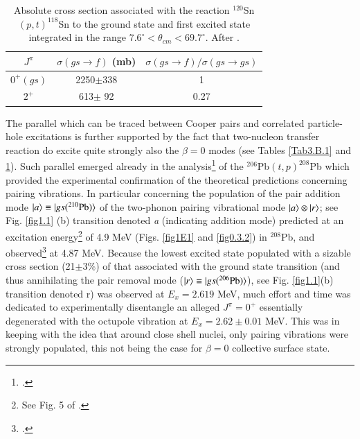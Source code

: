     \begin{table}
    	\begin{tabular}{|c|c|c|}
    		\hline
    		$J^{\pi}$& $\sigma(gs\rightarrow f)$ (mb) & $\sigma(gs\rightarrow f)/\sigma(gs\rightarrow gs)$  \\
    		\hline
    		$0^+(gs)$ & 2250$\pm$338& 1\\
    		$2^+$ & 613$\pm$ 92& 0.27\\
    		\hline
    	\end{tabular}\caption{Absolute cross section associated with the reaction $^{120}$Sn $(p,t)^{118}$Sn to the ground state and first excited state integrated in the range $7.6^\circ < \theta_{cm}<69.7^\circ$. After \cite{Guazzoni:08}.}\label{Tab3.B.2}
    \end{table}

 The parallel which can be traced between Cooper pairs and correlated particle-hole excitations is further supported by the fact that two-nucleon transfer reaction do excite quite strongly also the $\beta=0$ modes (see Tables \ref{Tab3.B.1} and \ref{Tab3.B.2}). 
Such parallel  emerged already in the analysis\footnote{\cite{Broglia:67}.} of the $^{206}$Pb$(t,p)^{208}$Pb which provided the experimental confirmation of the theoretical predictions concerning pairing vibrations. In particular concerning the population of the pair addition mode $|{a} \rangle\equiv|{gs(^{210}\text{Pb})} \rangle$ of the two-phonon pairing vibrational mode $|{a} \rangle\otimes|{r} \rangle$; see Fig. \ref{fig1.1} (b) transition denoted \emph{a} (indicating addition mode)  predicted at an excitation energy\footnote{See Fig. 5 of \cite{Bes:66}.} of 4.9 MeV (Figs. \ref{fig1E1} and \ref{fig0.3.2}) in $^{208}$Pb, and observed\footnote{\cite{Bjerregaard:66b}.} at 4.87 MeV. Because the lowest excited state populated with a sizable cross section (21$\pm3\%$) of that associated with the ground state transition (and thus annihilating the pair removal mode ($|{r} \rangle\equiv|{gs(^{206}\text{Pb})} \rangle$), see Fig. \ref{fig1.1}(b) transition denoted r) was observed at $E_x=2.619$ MeV, much effort and time was dedicated to experimentally disentangle an alleged $J^\pi=0^+$ essentially degenerated with the octupole vibration at $E_x=2.62\pm0.01$ MeV.  This was in keeping with the idea that around close shell nuclei, only pairing vibrations were strongly populated, this not being the case for $\beta=0$ collective surface state. 

